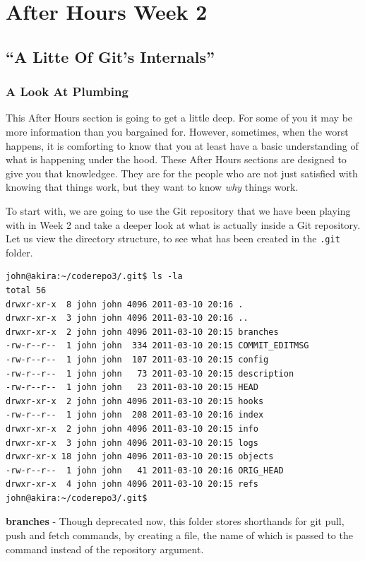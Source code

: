 \chapter{After Hours Week 2}
\section{``A Litte Of Git's Internals''}
\subsection{A Look At Plumbing}

This After Hours section is going to get a little deep.  For some of you it may be more information than you bargained for.  However, sometimes, when the worst happens, it is comforting to know that you at least have a basic understanding of what is happening under the hood.  These After Hours sections are designed to give you that knowledgee.  They are for the people who are not just satisfied with knowing that things work, but they want to know \emph{why} things work.

To start with, we are going to use the Git repository that we have been playing with in Week 2 and take a deeper look at what is actually inside a Git repository.  Let us view the directory structure, to see what has been created in the \texttt{.git} folder.

\begin{Verbatim}[frame=leftline,framerule=1mm,fontsize=\relsize{-3}] 
john@akira:~/coderepo3/.git$ ls -la
total 56
drwxr-xr-x  8 john john 4096 2011-03-10 20:16 .
drwxr-xr-x  3 john john 4096 2011-03-10 20:16 ..
drwxr-xr-x  2 john john 4096 2011-03-10 20:15 branches
-rw-r--r--  1 john john  334 2011-03-10 20:15 COMMIT_EDITMSG
-rw-r--r--  1 john john  107 2011-03-10 20:15 config
-rw-r--r--  1 john john   73 2011-03-10 20:15 description
-rw-r--r--  1 john john   23 2011-03-10 20:15 HEAD
drwxr-xr-x  2 john john 4096 2011-03-10 20:15 hooks
-rw-r--r--  1 john john  208 2011-03-10 20:16 index
drwxr-xr-x  2 john john 4096 2011-03-10 20:15 info
drwxr-xr-x  3 john john 4096 2011-03-10 20:15 logs
drwxr-xr-x 18 john john 4096 2011-03-10 20:15 objects
-rw-r--r--  1 john john   41 2011-03-10 20:16 ORIG_HEAD
drwxr-xr-x  4 john john 4096 2011-03-10 20:15 refs
john@akira:~/coderepo3/.git$ 

\end{Verbatim} 

\textbf{branches} - Though deprecated now, this folder stores shorthands for git pull, push and fetch commands, by creating a file, the name of which is passed to the command instead of the repository argument.

